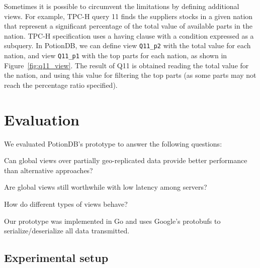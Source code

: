 \documentclass[sigplan,twocolumn,review,anonymous]{acmart}
\begin{document}
Sometimes it is possible to circumvent the limitations by defining additional views.
For example, TPC-H query 11 finds the suppliers stocks in a given nation that represent a significant percentage of the total
value of available parts in the nation. TPC-H specification uses a having clause with a condition expressed as a subquery.
In PotionDB, we can define view \texttt{Q11\_p2} with the total value for each nation, and view \texttt{Q11\_p1} with 
the top parts for each nation, as shown in Figure~\ref{fig:q11_view}.
The result of Q11 is obtained reading the total value for the nation, and using this value for 
filtering the top parts (as some parts may not
reach the percentage ratio specified).


\section{Evaluation}
\label{sec:evaluation}



We evaluated PotionDB's prototype to answer the following questions: 
\begin{enumerate*}[label=(\roman*)]
	\item  \label{enum:q1} Can global views over partially geo-replicated data provide better performance than alternative approaches? 	     
	\item \label{enum:q2} Are global views still worthwhile with low latency among servers?
	\item \label{enum:q3} How do different types of views behave? 
\end{enumerate*}

Our prototype was implemented in Go and uses Google's protobufs to serialize/deserialize all data transmitted.

\subsection{Experimental setup}
\label{subsec:setup}
\end{document}
